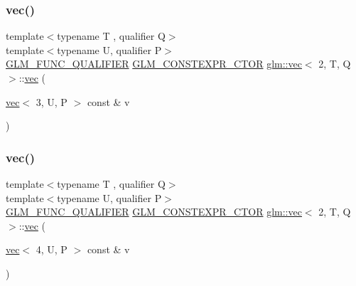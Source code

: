 \mbox{\label{structglm_1_1vec_3_012_00_01_t_00_01_q_01_4_ac6f3c81265603dd5c06c75776911aff4}} 
\subsubsection{\texorpdfstring{vec()}{vec()}\hspace{0.1cm}{\footnotesize\ttfamily [16/17]}}
{\footnotesize\ttfamily template$<$typename T , qualifier Q$>$ \\
template$<$typename U, qualifier P$>$ \\
\hyperlink{setup_8hpp_a33fdea6f91c5f834105f7415e2a64407}{G\+L\+M\+\_\+\+F\+U\+N\+C\+\_\+\+Q\+U\+A\+L\+I\+F\+I\+ER} \hyperlink{setup_8hpp_ad34178a09666081abdb573c14d1f4a5a}{G\+L\+M\+\_\+\+C\+O\+N\+S\+T\+E\+X\+P\+R\+\_\+\+C\+T\+OR} \hyperlink{structglm_1_1vec}{glm\+::vec}$<$ 2, T, Q $>$\+::\hyperlink{structglm_1_1vec}{vec} (\begin{DoxyParamCaption}\item[{\hyperlink{structglm_1_1vec}{vec}$<$ 3, U, P $>$ const \&}]{v }\end{DoxyParamCaption})}

\mbox{\label{structglm_1_1vec_3_012_00_01_t_00_01_q_01_4_a369d48c9ccf09e6ef21f17178abf9f81}} 
\subsubsection{\texorpdfstring{vec()}{vec()}\hspace{0.1cm}{\footnotesize\ttfamily [17/17]}}
{\footnotesize\ttfamily template$<$typename T , qualifier Q$>$ \\
template$<$typename U, qualifier P$>$ \\
\hyperlink{setup_8hpp_a33fdea6f91c5f834105f7415e2a64407}{G\+L\+M\+\_\+\+F\+U\+N\+C\+\_\+\+Q\+U\+A\+L\+I\+F\+I\+ER} \hyperlink{setup_8hpp_ad34178a09666081abdb573c14d1f4a5a}{G\+L\+M\+\_\+\+C\+O\+N\+S\+T\+E\+X\+P\+R\+\_\+\+C\+T\+OR} \hyperlink{structglm_1_1vec}{glm\+::vec}$<$ 2, T, Q $>$\+::\hyperlink{structglm_1_1vec}{vec} (\begin{DoxyParamCaption}\item[{\hyperlink{structglm_1_1vec}{vec}$<$ 4, U, P $>$ const \&}]{v }\end{DoxyParamCaption})}



